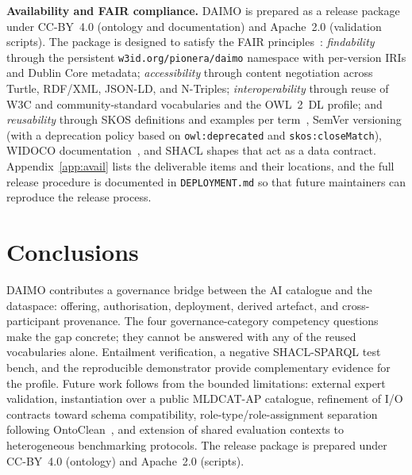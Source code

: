 \documentclass[11pt,a4paper]{article}
\newcommand{\code}[1]{\texttt{#1}}
\begin{document}
\medskip
\noindent\textbf{Availability and FAIR compliance.}\label{sec:avail}
DAIMO is prepared as a release package under CC-BY~4.0 (ontology and documentation) and Apache~2.0 (validation scripts). The package is designed to satisfy the FAIR principles~\cite{fair}: \emph{findability} through the persistent \code{w3id.org/pionera/daimo} namespace with per-version IRIs and Dublin Core metadata; \emph{accessibility} through content negotiation across Turtle, RDF/XML, JSON-LD, and N-Triples; \emph{interoperability} through reuse of W3C and community-standard vocabularies and the OWL~2~DL profile; and \emph{reusability} through SKOS definitions and examples per term~\cite{skos}, SemVer versioning (with a deprecation policy based on \code{owl:deprecated} and \code{skos:closeMatch}), WIDOCO documentation~\cite{widoco}, and SHACL shapes that act as a data contract. Appendix~\ref{app:avail} lists the deliverable items and their locations, and the full release procedure is documented in \code{DEPLOYMENT.md} so that future maintainers can reproduce the release process.

\section{Conclusions}\label{sec:conclusion}

DAIMO contributes a governance bridge between the AI catalogue and the dataspace: offering, authorisation, deployment, derived artefact, and cross-participant provenance. The four governance-category competency questions make the gap concrete; they cannot be answered with any of the reused vocabularies alone. Entailment verification, a negative SHACL-SPARQL test bench, and the reproducible demonstrator provide complementary evidence for the profile. Future work follows from the bounded limitations: external expert validation, instantiation over a public MLDCAT-AP catalogue, refinement of I/O contracts toward schema compatibility, role-type/role-assignment separation following OntoClean~\cite{ontoclean}, and extension of shared evaluation contexts to heterogeneous benchmarking protocols. The release package is prepared under CC-BY~4.0 (ontology) and Apache~2.0 (scripts).
\end{document}
